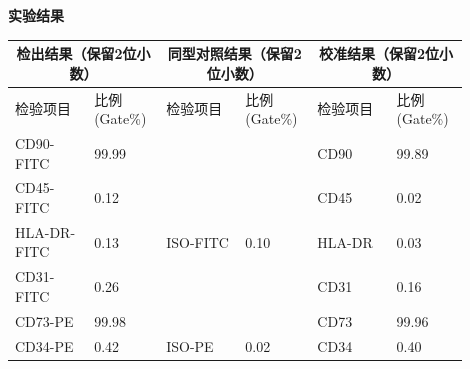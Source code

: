 \documentclass[UTF8,10pt,a4paper,fontset=fandol]{ctexart}
\newcommand{\fieldvalue}[1]{#1}
\newcommand{\handwritten}[1]{#1}
\begin{document}
\begin{center}
\small
\textbf{实验结果}

\begin{tabular}{|p{0.16\linewidth}|p{0.14\linewidth}|p{0.16\linewidth}|p{0.14\linewidth}|p{0.16\linewidth}|p{0.14\linewidth}|}
\hline
\multicolumn{2}{c|}{检出结果（保留2位小数）} &
\multicolumn{2}{c|}{同型对照结果（保留2位小数）} &
\multicolumn{2}{c|}{校准结果（保留2位小数）}\\
\hline
检验项目 & 比例(Gate\%) & 检验项目 & 比例(Gate\%) & 检验项目 & 比例(Gate\%)\\
\hline
CD90-FITC &
\fieldvalue{\handwritten{99.99}} &
& &
CD90 &
\fieldvalue{\handwritten{99.89}}\\
\hline
CD45-FITC &
\fieldvalue{\handwritten{0.12}} &
& &
CD45 &
\fieldvalue{\handwritten{0.02}}\\
\hline
HLA-DR-FITC &
\fieldvalue{\handwritten{0.13}} &
ISO-FITC &
\fieldvalue{\handwritten{0.10}} &
HLA-DR &
\fieldvalue{\handwritten{0.03}}\\
\hline
CD31-FITC &
\fieldvalue{\handwritten{0.26}} &
& &
CD31 &
\fieldvalue{\handwritten{0.16}}\\
\hline
CD73-PE &
\fieldvalue{\handwritten{99.98}} &
& &
CD73 &
\fieldvalue{\handwritten{99.96}}\\
\hline
CD34-PE &
\fieldvalue{\handwritten{0.42}} &
ISO-PE &
\fieldvalue{\handwritten{0.02}} &
CD34 &
\fieldvalue{\handwritten{0.40}}\\

\end{tabular}
\end{center}
\end{document}
